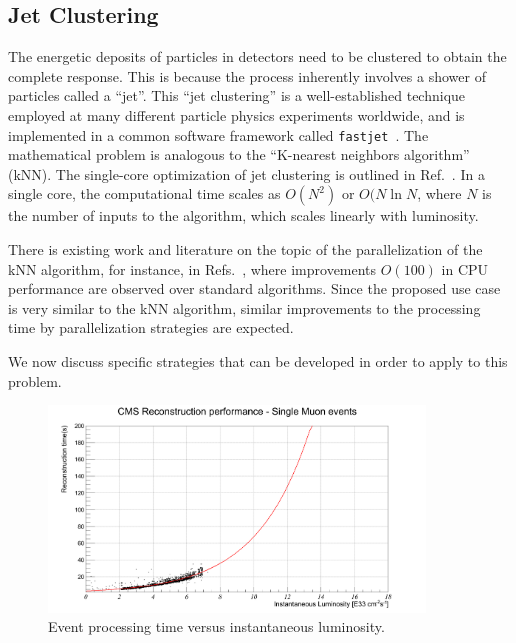\documentclass[12pt]{article}
\begin{document}
 

\subsection{Jet Clustering} 




The energetic deposits of particles in detectors need to be clustered
to obtain the
complete response. This is because the process
inherently involves a shower of particles called a ``jet''. This
``jet clustering'' is a well-established technique employed at
many different particle physics experiments worldwide, and is
implemented in a common software framework called 
{\tt fastjet}~\cite{fastjet_manual}. 
The mathematical problem is analogous to the
``K-nearest neighbors algorithm''~\cite{knn_ieee} (kNN). 
The single-core optimization of
jet clustering
is outlined in Ref.~\cite{fastjet_timing}. In a single core,
the computational time scales as $O(N^2)$ or  $O(N \ln{N}$, where $N$
is the number of inputs to the algorithm, which scales linearly with
luminosity. 

There is existing work and literature on the topic of the
parallelization of the kNN algorithm, for instance, in
Refs.~\cite{knn_gpu_1, knn_gpu_2, knn_gpu_3}, where improvements
$O(100)$ in CPU performance are observed over standard
algorithms. Since the proposed use case is
very similar to the kNN algorithm, similar improvements to the
processing time by parallelization strategies are expected. 

We now discuss specific strategies that can be developed in order to
apply to this problem. 

\begin{figure}[h!]
    \centering
    \includegraphics[width=100mm]{lumitpeSingleMu-fitted2.png}
    \caption{\label{lumitpeSingleMu} Event processing time versus
      instantaneous luminosity.}
\end{figure}
\end{document}
